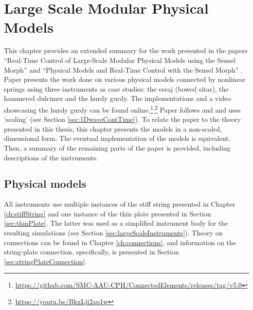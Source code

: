 \chapter{Large Scale Modular Physical Models}\label{ch:largeScale}
This chapter provides an extended summary for the work presented in the papers ``Real-Time Control of Large-Scale Modular Physical Models using the Sensel Morph'' \citeP[A] and ``Physical Models and Real-Time Control with the Sensel Morph'' \citeP[B].  Paper \citeP[A] presents the work done on various physical models connected by nonlinear springs using three instruments as case studies: the esraj (bowed sitar), the hammered dulcimer and the hurdy gurdy. The implementations and a video showcasing the hurdy gurdy can be found online.\footnote{\url{https://github.com/SMC-AAU-CPH/ConnectedElements/releases/tag/v5.0}}\textsuperscript{,}\footnote{\url{https://youtu.be/BkxLji2ap1w}} Paper \citeP[A] follows \cite{theBible} and \cite{Bilbao2009Modular} and uses `scaling' (see Section \ref{sec:1DwaveContTime}). To relate the paper to the theory presented in this thesis, this chapter presents the models in a non-scaled, dimensional form. The eventual implementation of the models is equivalent. Then, a summary of the remaining parts of the paper is provided, including descriptions of the instruments.

\section{Physical models}\label{sec:modelsLargeScale}
All instruments use multiple instances of the stiff string presented in Chapter \ref{ch:stiffString} and one instance of the thin plate presented in Section \ref{sec:thinPlate}. The latter was used as a simplified instrument body for the resulting simulations (see Section \ref{sec:largeScaleInstruments}). Theory on connections can be found in Chapter \ref{ch:connections}, and information on the string-plate connection, specifically, is presented in Section \ref{sec:stringPlateConnection}.

